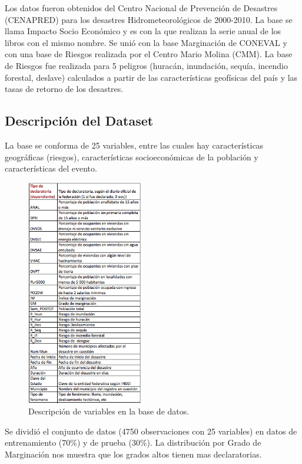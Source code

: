 \documentclass[]{article}
\begin{document}
Los datos fueron obtenidos del Centro Nacional de Prevención de
Desastres (CENAPRED) para los desastres Hidrometeorológicos de
2000-2010. La base se llama Impacto Socio Económico y es con la que
realizan la serie anual de los libros con el mismo nombre. Se unió con
la base Marginación de CONEVAL y con una base de Riesgos realizada por
el Centro Mario Molina (CMM). La base de Riesgos fue realizada para 5
peligros (huracán, inundación, sequía, incendio forestal, deslave)
calculados a partir de las características geofísicas del país y las
tasas de retorno de los desastres.

\subsection{Descripción del Dataset}\label{descripcion-del-dataset}

La base se conforma de 25 variables, entre las cuales hay
características geográficas (riesgos), características socioeconómicas
de la población y características del evento.

\begin{figure}[H]
\centering
\includegraphics[width=0.45\textwidth]{img/var.png}
\caption{Descripción de variables en la base de datos.}

\end{figure}

Se dividió el conjunto de datos (4750 observaciones con 25 variables) en
datos de entrenamiento (70\%) y de prueba (30\%). La distribución por
Grado de Marginación nos muestra que los grados altos tienen mas
declaratorias.
\end{document}
